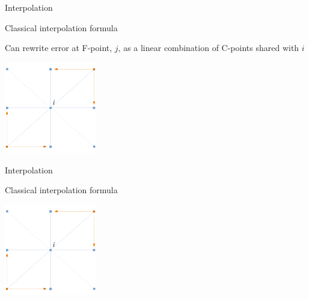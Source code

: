 \documentclass[18pt,xcolor=table]{beamer}
\begin{document}
\begin{frame}{Interpolation}
\begin{block}{Classical interpolation formula}
\bit
\item Can rewrite error at F-point, $j$, as a linear combination of C-points shared with $i$
\eit
{}
\end{block}
\begin{center}
\includegraphics[width=0.3\textwidth]{../figures/interpStencilStrongF}
\end{center}
\end{frame}

\begin{frame}{Interpolation}
\begin{block}{Classical interpolation formula}
\end{block}
\begin{center}
\includegraphics[width=0.3\textwidth]{../figures/interpStencilStrongF}
\end{center}
\end{frame}
\end{document}

